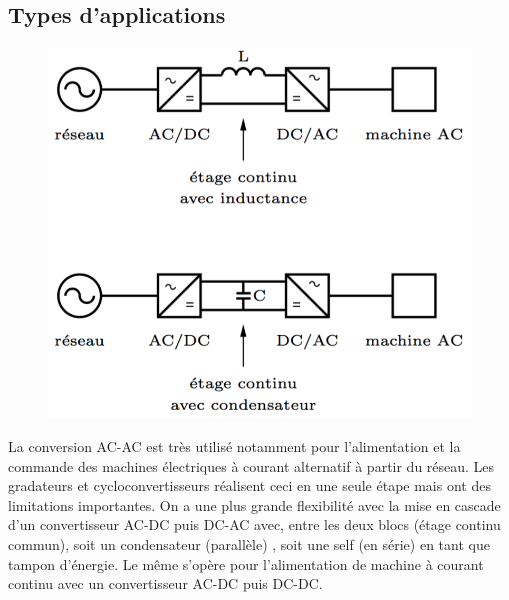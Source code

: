 	\subsection{Types d'applications}
		\begin{figure}
		\vspace{-5mm}
		\includegraphics[scale=0.25]{ch1/4}
		\end{figure}		
		La conversion AC-AC est très utilisé notamment pour l'alimentation et la commande des machines électriques à courant alternatif à partir du réseau. Les gradateurs et cycloconvertisseurs réalisent ceci en une seule étape mais ont des limitations importantes. On a une plus grande flexibilité avec la mise en cascade d'un convertisseur AC-DC puis DC-AC avec, entre les deux blocs (étage continu commun), soit un condensateur (parallèle) , soit une self (en série) en tant que tampon d'énergie. Le même s'opère pour l'alimentation de machine à courant continu avec un convertisseur AC-DC puis DC-DC. \\
		
